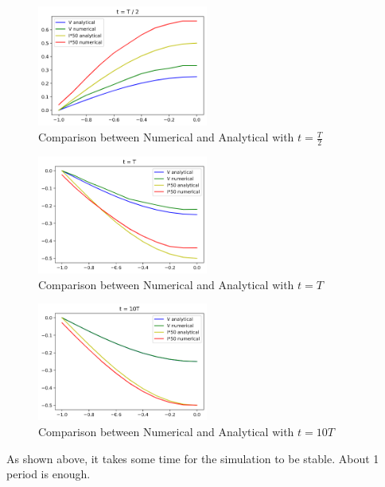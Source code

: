 \documentclass{article}
\begin{document}
    \begin{figure}[H]
        \centering
        \includegraphics[width=0.5\textwidth]{img/3_4.png}
        \caption{Comparison between Numerical and Analytical with $t = \frac{T}{2}$}
        \label{fig:3-4}
    \end{figure}

    \begin{figure}[H]
        \centering
        \includegraphics[width=0.5\textwidth]{img/3_5.png}
        \caption{Comparison between Numerical and Analytical with $t = T$}
        \label{fig:3-5}
    \end{figure}

    \begin{figure}[H]
        \centering
        \includegraphics[width=0.5\textwidth]{img/3_6.png}
        \caption{Comparison between Numerical and Analytical with $t = 10T$}
        \label{fig:3-6}
    \end{figure}

    As shown above, it takes some time for the simulation to be stable. About 1 period is enough.
\end{document}

